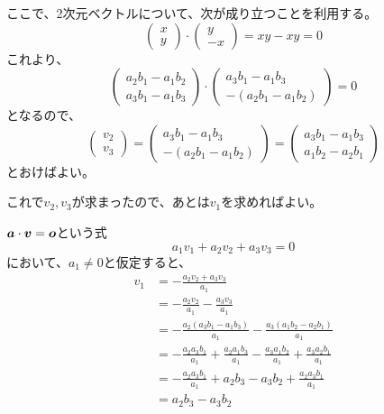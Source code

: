 \documentclass[../../../topic_linear-algebra]{subfiles}
\begin{document}
ここで、2次元ベクトルについて、次が成り立つことを利用する。
\begin{equation*}
  \begin{pmatrix}
    x \\
    y
  \end{pmatrix} \cdot \begin{pmatrix}
    y \\
    -x
  \end{pmatrix} = xy - xy = 0
\end{equation*}
これより、
\begin{equation*}
  \begin{pmatrix}
    a_2 b_1 - a_1 b_2 \\
    a_3 b_1 - a_1 b_3
  \end{pmatrix} \cdot \begin{pmatrix}
    a_3 b_1 - a_1 b_3 \\
    -(a_2 b_1 - a_1 b_2)
  \end{pmatrix} = 0
\end{equation*}
となるので、
\begin{equation*}
  \begin{pmatrix}
    v_2 \\
    v_3
  \end{pmatrix} = \begin{pmatrix}
    a_3 b_1 - a_1 b_3 \\
    -(a_2 b_1 - a_1 b_2)
  \end{pmatrix} = \begin{pmatrix}
    a_3 b_1 - a_1 b_3 \\
    a_1 b_2 - a_2 b_1
  \end{pmatrix}
\end{equation*}
とおけばよい。

\br

これで$v_2, v_3$が求まったので、あとは$v_1$を求めればよい。

$\vb*{a} \cdot \vb*{v} = \vb*{o}$という式
\begin{equation*}
  a_1 v_1 + a_2 v_2 + a_3 v_3 = 0
\end{equation*}
において、$a_1 \neq 0$と仮定すると、
\begin{align*}
  v_1 &= -\frac{a_2 v_2 + a_3 v_3}{a_1} \\
  &= - \frac{a_2v_2}{a_1} - \frac{a_3v_3}{a_1} \\
  &= - \frac{a_2(a_3b_1 - a_1b_3)}{a_1} - \frac{a_3(a_1b_2 - a_2b_1)}{a_1} \\
  &= - \frac{a_2a_3b_1}{a_1} + \frac{a_2a_1b_3}{a_1} - \frac{a_3a_1b_2}{a_1} + \frac{a_3a_2b_1}{a_1} \\
  &= - \frac{a_2a_3b_1}{a_1} + a_2b_3 - a_3b_2 + \frac{a_2a_3b_1}{a_1} \\
  &= a_2b_3 - a_3b_2
\end{align*}
\end{document}
